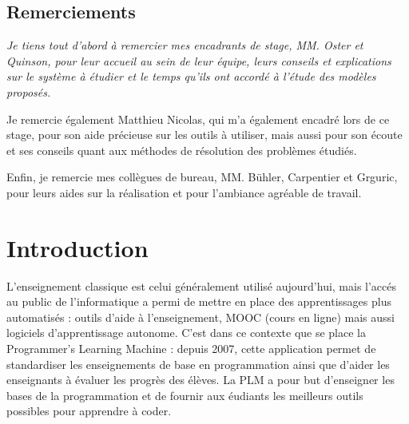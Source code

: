 \documentclass[stage]{tnreport}
\begin{document}
\maketitle
{}


\cleardoublepage

\makesecondtitle

\section*{Remerciements}

{\em
Je tiens tout d'abord à remercier mes encadrants de stage, MM. Oster et Quinson, pour leur accueil au sein de leur équipe, leurs conseils et explications sur le système à étudier et le temps qu'ils ont accordé à l'étude des modèles proposés.

Je remercie également Matthieu Nicolas, qui m'a également encadré lors de ce stage, pour son aide précieuse sur les outils à utiliser, mais aussi pour son écoute et ses conseils quant aux méthodes de résolution des problèmes étudiés.

Enfin, je remercie mes collègues de bureau, MM. Bühler, Carpentier et Grguric, pour leurs aides sur la réalisation et pour l'ambiance agréable de travail.
}

\cleardoublepage

\renewcommand{\baselinestretch}{0.5}\normalsize
\tableofcontents
\renewcommand{\baselinestretch}{1.0}\normalsize
\cleardoublepage

\setcounter{page}{1}

\chapter*{Introduction}

L'enseignement classique est celui généralement utilisé aujourd'hui, mais l'accés au public de l'informatique a permi de mettre en place des apprentissages plus automatisés : outils d'aide à l'enseignement, MOOC (cours en ligne) mais aussi logiciels d'apprentissage autonome.
C'est dans ce contexte que se place la Programmer's Learning Machine : depuis 2007, cette application permet de standardiser les enseignements de base en programmation ainsi que d'aider les enseignants à évaluer les progrès des élèves.
La PLM a pour but d'enseigner les bases de la programmation et de fournir aux éudiants les meilleurs outils possibles pour apprendre à coder.
\end{document}
